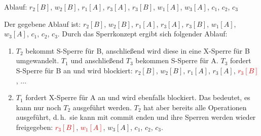 \begin{beamerText}
 Ablauf: $r_2[B]$, $w_2[B]$, $r_1[A]$, $r_3[A]$, $r_3[B]$, $w_1[A]$, $w_3[A]$, $c_1$, $c_2$, $c_3$
\end{beamerText}
\begin{solution}
Der gegebene Ablauf ist: $r_2[B]$, $w_2[B]$, $r_1[A]$, $r_3[A]$, $r_3[B]$, $w_1[A]$, $w_3[A]$, $c_1$, $c_2$, $c_3$. Durch das Sperrkonzept ergibt sich folgender Ablauf:

\begin{enumerate}[1.]

	\item $T_2$ bekommt S-Sperre für B, anschließend wird diese in eine X-Sperre für B umgewandelt. $T_1$ und anschließend $T_3$ bekommen S-Sperre für A. $T_3$ fordert S-Sperre für B an und wird blockiert: $r_2[B]$, $w_2[B]$, $r_1[A]$, $r_3[A]$, \textcolor{red}{$r_3[B]$}, $\ldots$


	\item $T_1$ fordert X-Sperre für A an und wird ebenfalls blockiert. Das bedeutet, es kann nur noch $T_2$ ausgeführt werden. $T_2$ hat aber bereits alle Operationen ausgeführt, d.\,h.\ sie kann mit commit enden und ihre Sperren werden wieder freigegeben: \textcolor{red}{$r_3[B]$}, \textcolor{red}{$w_1[A]$}, $w_3[A]$, $c_1$, $c_2$, $c_3$.


\end{enumerate}
\end{solution}
